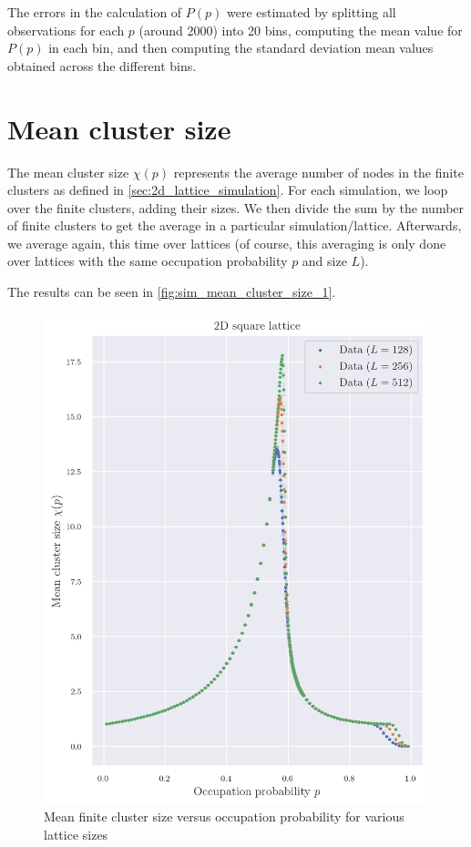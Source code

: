 The errors in the calculation of $P(p)$ were estimated by splitting all observations for each $p$ (around 2000) into 20 bins, computing the mean value for $P(p)$ in each bin, and then computing the standard deviation mean values obtained across the different bins.


\section{Mean cluster size}
\label{sec:sim_mean_clust_size}

The mean cluster size $\chi(p)$ represents the average number of nodes in the finite clusters as defined in \autoref{sec:2d_lattice_simulation}. For each simulation, we loop over the finite clusters, adding their sizes. We then divide the sum by the number of finite clusters to get the average in a particular simulation/lattice. Afterwards, we average again, this time over lattices (of course, this averaging is only done over lattices with the same occupation probability $p$ and size $L$). 


The results can be seen in \autoref{fig:sim_mean_cluster_size_1}.



\begin{figure}[H]
  \includegraphics[width=\linewidth]{Images/sim_mean_cluster_size_1.png}
  \caption{Mean finite cluster size versus occupation probability for various lattice sizes}
  \label{fig:sim_mean_cluster_size_1}
\end{figure}


